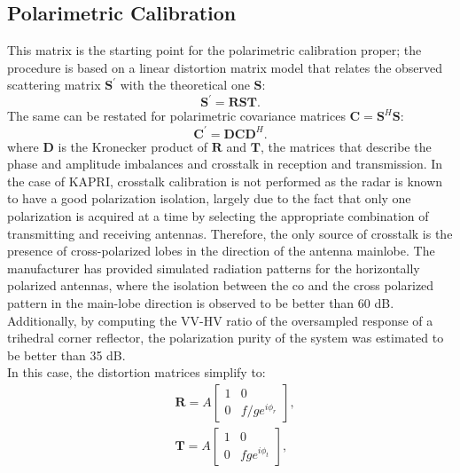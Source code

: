 \subsection{Polarimetric Calibration}\label{sec:methods:proc_polcal}
This matrix is the starting point for the polarimetric calibration proper;
the procedure is based on a linear distortion matrix model\cite{Saraband1990, Sarabandi1992a} that relates the observed scattering matrix $\mathbf{S^\prime}$ with the theoretical one $\mathbf{S}$:
\begin{equation}\label{eq:distorsion_scattering}
	\mathbf{S^\prime} = \mathbf{R} \mathbf{S} \mathbf{T}.
\end{equation}
The same can be restated for polarimetric covariance matrices $\mathbf{C} = \mathbf{S}^{H}\mathbf{S}$:
\begin{equation}\label{eq:covariance_distortion}
	\mathbf{C}^\prime = \mathbf{D} \mathbf{C} \mathbf{D}^{H}.
\end{equation}
where $\mathbf{D}$ is the Kronecker product of $\mathbf{R}$ and $\mathbf{T}$, the matrices that describe the phase and amplitude imbalances and crosstalk in reception and transmission.
In the case of KAPRI, crosstalk calibration is not performed as the radar is known to have a good polarization isolation, largely due to the fact that only one polarization is acquired at a time by selecting the appropriate combination of transmitting and receiving antennas. Therefore, the only source of crosstalk is the presence of cross-polarized lobes in the direction of the antenna mainlobe. The manufacturer has provided simulated radiation patterns for the horizontally polarized antennas, where the isolation between the co and the cross polarized pattern in the main-lobe direction is observed to be better than 60 dB. Additionally, by computing the VV-HV ratio of the oversampled response of a trihedral corner reflector, the polarization purity of the system was estimated to be better than 35 dB.\\
In this case, the distortion matrices simplify to:
\begin{equation}
	\begin{aligned}
	&\mathbf{R} = A \begin{bmatrix}
		1 & 0\\
		0 & f/g e^{i\phi_{r}}
	\end{bmatrix},\\
	&\mathbf{T} = A \begin{bmatrix}
			1 & 0\\
			0 & f g e^{i\phi_{t}}
		\end{bmatrix},
	\end{aligned}
\end{equation}
